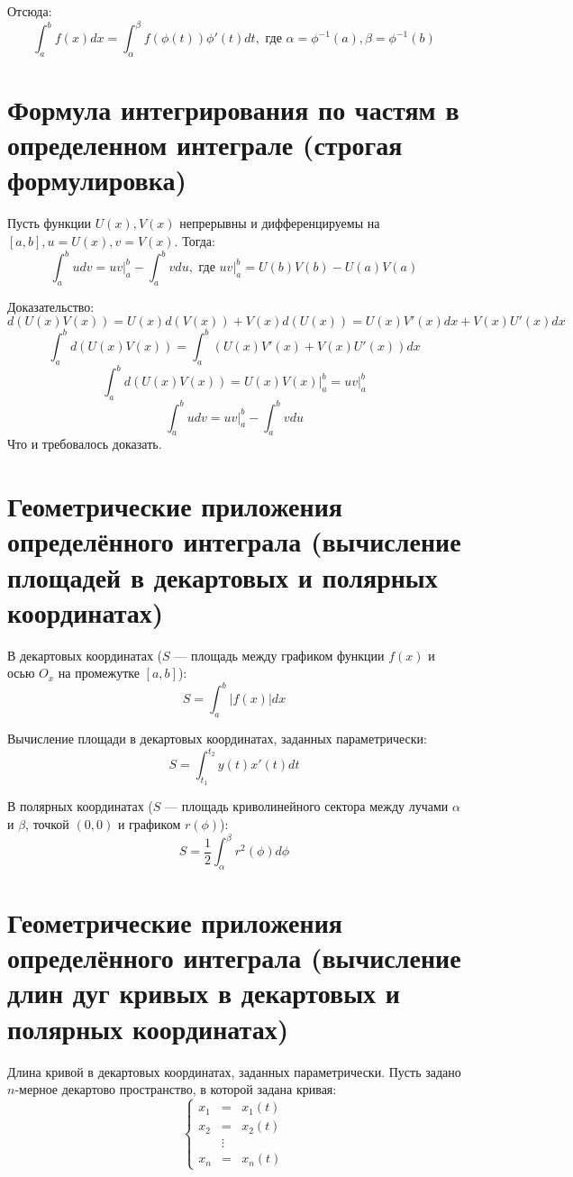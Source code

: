 \documentclass[12pt]{article}
\begin{document}
Отсюда:
\[
    \int_a^b f(x)dx = \int_{\alpha}^{\beta} f(\phi(t))\phi'(t)dt, \text{ где } \alpha
    = \phi^{-1}(a), \beta = \phi^{-1}(b)
\]

\section{Формула интегрирования по частям в определенном интеграле (строгая формулировка)}
Пусть функции $U(x), V(x)$ непрерывны и дифференцируемы на $[a, b], u = U(x), v = V(x)$. Тогда:
\[
    \int_a^b udv = uv\bigg|_a^b - \int_a^b vdu, \text{ где } uv|_a^b
    = U(b)V(b) - U(a)V(a)
\]

Доказательство:
\[
    d(U(x)V(x)) = U(x)d(V(x)) + V(x)d(U(x)) = U(x)V'(x)dx + V(x)U'(x)dx
\]
\[
    \int_a^b d(U(x)V(x)) = \int_a^b (U(x)V'(x) + V(x)U'(x))dx
\]
\[
    \int_a^b d(U(x)V(x)) = U(x)V(x)\bigg\rvert_a^b = uv\bigg\rvert_a^b
\]
\[
    \int_a^b udv = uv\bigg\rvert_a^b - \int_a^b vdu
\]
Что и требовалось доказать.

\section{Геометрические приложения определённого интеграла (вычисление площадей в декартовых и полярных координатах)}
В декартовых координатах ($S$ — площадь между графиком функции $f(x)$ и осью $O_x$ на промежутке $[a, b]$):
\[
    S = \int_a^b |f(x)|dx
\]

Вычисление площади в декартовых координатах, заданных параметрически:
\[
    S = \int_{t_1}^{t_2}y(t)x'(t)dt
\]

В полярных координатах ($S$ — площадь криволинейного сектора между лучами $\alpha$ и $\beta$, точкой $(0, 0)$ и графиком $r(\phi)$):
\[
    S = \dfrac{1}{2}\int_\alpha^\beta r^2(\phi)d\phi
\]

\section{Геометрические приложения определённого интеграла (вычисление длин дуг кривых в декартовых и полярных координатах)}
Длина кривой в декартовых координатах, заданных параметрически. Пусть задано $n$-мерное декартово пространство, в которой задана кривая:
\[
    \left\{\begin{array}{rcl}
        x_1 & =      & x_1(t) \\
        x_2 & =      & x_2(t) \\
            & \vdots &        \\
        x_n & =      & x_n(t)
    \end{array}\right.
\]
\end{document}
